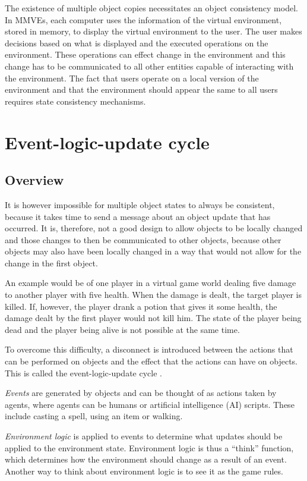 The existence of multiple object copies necessitates an object consistency model. In MMVEs, each computer uses the information of the virtual environment, stored in memory, to display the virtual environment to the user. The user makes decisions based on what is displayed and the executed operations on the environment. These operations can effect change in the environment and this change has to be communicated to all other entities capable of interacting with the environment. The fact that users operate on a local version of the environment and that the environment should appear the same to all users requires state consistency mechanisms.

\section{Event-logic-update cycle}
\label{event_logic_update}

\subsection{Overview}

It is however impossible for multiple object states to always be consistent, because it takes time to send a message about an object update that has occurred. It is, therefore, not a good design to allow objects to be locally changed and those changes to then be communicated to other objects, because other objects may also have been locally changed in a way that would not allow for the change in the first object.

An example would be of one player in a virtual game world dealing five damage to another player with five health. When the damage is dealt, the target player is killed. If, however, the player drank a potion that gives it some health, the damage dealt by the first player would not kill him. The state of the player being dead and the player being alive is not possible at the same time.

To overcome this difficulty, a disconnect is introduced between the actions that can be performed on objects and the effect that the actions can have on objects. This is called the event-logic-update cycle \cite{}.

\emph{Events} are generated by objects and can be thought of as actions taken by agents, where agents can be humans or artificial intelligence (AI) scripts. These include casting a spell, using an item or walking.

\emph{Environment logic} is applied to events to determine what updates should be applied to the environment state. Environment logic is thus a ``think'' function, which determines how the environment should change as a result of an event. Another way to think about environment logic is to see it as the game rules.

